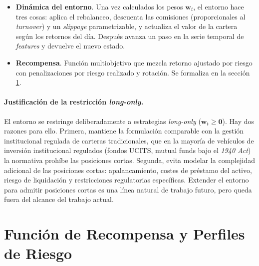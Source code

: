 \documentclass[IB,a4paper]{TFUOC}
\begin{document}
\begin{itemize}
\noindent\textit{Salvedad sobre la parametrización de la política.} La política Gaussiana diagonal del \textit{actor} no modela de forma nativa el simplex de pesos: muestrea una acción en la caja $[0,1]^{n}$ y la normalización a simplex se realiza después dentro del entorno. Esto puede distorsionar parcialmente la exploración y los gradientes en los bordes del simplex, frente a alternativas como una política \textit{softmax} o una política Dirichlet, que respetan el simplex por construcción. Se mantiene la parametrización gaussiana por compatibilidad con la implementación estándar de PPO/A2C/SAC en Stable-Baselines3; el cambio a una política Dirichlet queda como línea natural de mejora.
    \item \textbf{Dinámica del entorno}. Una vez calculados los pesos $\mathbf{w}_t$, el entorno hace tres cosas: aplica el rebalanceo, descuenta las comisiones (proporcionales al \textit{turnover}) y un \textit{slippage} parametrizable, y actualiza el valor de la cartera según los retornos del día. Después avanza un paso en la serie temporal de \textit{features} y devuelve el nuevo estado.
    \item \textbf{Recompensa}. Función multiobjetivo que mezcla retorno ajustado por riesgo con penalizaciones por riesgo realizado y rotación. Se formaliza en la sección \ref{sec:recompensa}.
\end{itemize}

\paragraph{Justificación de la restricción \textit{long-only}.} El entorno se restringe deliberadamente a estrategias \textit{long-only} ($\mathbf{w}_t \geq \mathbf{0}$). Hay dos razones para ello. Primera, mantiene la formulación comparable con la gestión institucional regulada de carteras tradicionales, que en la mayoría de vehículos de inversión institucional regulados (fondos UCITS, mutual funds bajo el \textit{1940 Act}) la normativa prohíbe las posiciones cortas. Segunda, evita modelar la complejidad adicional de las posiciones cortas: apalancamiento, costes de préstamo del activo, riesgo de liquidación y restricciones regulatorias específicas. Extender el entorno para admitir posiciones cortas es una línea natural de trabajo futuro, pero queda fuera del alcance del trabajo actual.

\section{Función de Recompensa y Perfiles de Riesgo}
\label{sec:recompensa}
\end{document}
